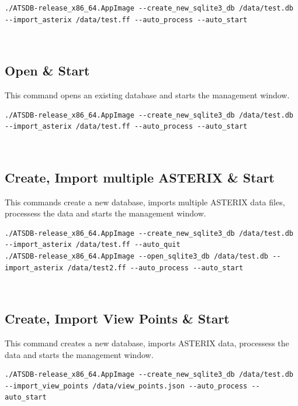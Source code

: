 \begin{lstlisting}
./ATSDB-release_x86_64.AppImage --create_new_sqlite3_db /data/test.db --import_asterix /data/test.ff --auto_process --auto_start
\end{lstlisting}
\ \\

\subsection{Open \& Start}

This command opens an existing database and starts the management window.

\begin{lstlisting}
./ATSDB-release_x86_64.AppImage --create_new_sqlite3_db /data/test.db --import_asterix /data/test.ff --auto_process --auto_start
\end{lstlisting}
\ \\

\subsection{Create, Import multiple ASTERIX \& Start}

This commands create a new database, imports multiple ASTERIX data files, processess the data and starts the management window.

\begin{lstlisting}
./ATSDB-release_x86_64.AppImage --create_new_sqlite3_db /data/test.db --import_asterix /data/test.ff --auto_quit
./ATSDB-release_x86_64.AppImage --open_sqlite3_db /data/test.db --import_asterix /data/test2.ff --auto_process --auto_start
\end{lstlisting}
\ \\

\subsection{Create, Import View Points \& Start}

This command creates a new database, imports ASTERIX data, processess the data and starts the management window.

\begin{lstlisting}
./ATSDB-release_x86_64.AppImage --create_new_sqlite3_db /data/test.db --import_view_points /data/view_points.json --auto_process --auto_start
\end{lstlisting}
\ \\

